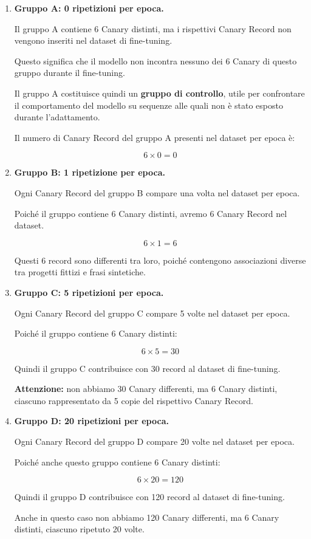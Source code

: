 \begin{enumerate}

    \item \textbf{Gruppo A: 0 ripetizioni per epoca.}

    Il gruppo A contiene 6 Canary distinti, ma i
    rispettivi Canary Record non vengono inseriti
    nel dataset di fine-tuning.

    Questo significa che il modello non incontra
    nessuno dei 6 Canary di questo gruppo
    durante il fine-tuning.

    Il gruppo A costituisce quindi un
    \textbf{gruppo di controllo}, utile per confrontare
    il comportamento del modello su sequenze
    alle quali non è stato esposto durante
    l'adattamento.

    Il numero di Canary Record del gruppo A
    presenti nel dataset per epoca è:

    \[
    6 \times 0 = \boxed{0}
    \]

    \item \textbf{Gruppo B: 1 ripetizione per epoca.}

    Ogni Canary Record del gruppo B compare
    una volta nel dataset per epoca.

    Poiché il gruppo contiene 6 Canary distinti,
    avremo 6 Canary Record nel dataset.

    \[
    6 \times 1 = \boxed{6}
    \]

    Questi 6 record sono differenti tra loro,
    poiché contengono associazioni diverse
    tra progetti fittizi e frasi sintetiche.

    \item \textbf{Gruppo C: 5 ripetizioni per epoca.}

    Ogni Canary Record del gruppo C compare
    5 volte nel dataset per epoca.

    Poiché il gruppo contiene 6 Canary distinti:

    \[
    6 \times 5 = \boxed{30}
    \]

    Quindi il gruppo C contribuisce con
    30 record al dataset di fine-tuning.

    \textbf{Attenzione:} non abbiamo 30 Canary
    differenti, ma 6 Canary distinti,
    ciascuno rappresentato da 5 copie
    del rispettivo Canary Record.

    \item \textbf{Gruppo D: 20 ripetizioni per epoca.}

    Ogni Canary Record del gruppo D compare
    20 volte nel dataset per epoca.

    Poiché anche questo gruppo contiene
    6 Canary distinti:

    \[
    6 \times 20 = \boxed{120}
    \]

    Quindi il gruppo D contribuisce con
    120 record al dataset di fine-tuning.

    Anche in questo caso non abbiamo
    120 Canary differenti, ma 6 Canary distinti,
    ciascuno ripetuto 20 volte.

\end{enumerate}

